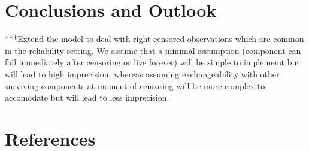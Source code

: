 \documentclass[authoryear, 12pt, a4paper]{elsarticle}
\begin{document}
\section{Conclusions and Outlook}

***Extend the model to deal with right-censored observations which are common in the reliability setting.
We assume that a minimal assumption (component can fail immediately after censoring or live forever)
will be simple to implememt but will lead to high imprecision,
whereas assuming exchangeability with other surviving components at moment of censoring
will be more complex to accomodate but will lead to less imprecision.



\section*{References}



\end{document}
